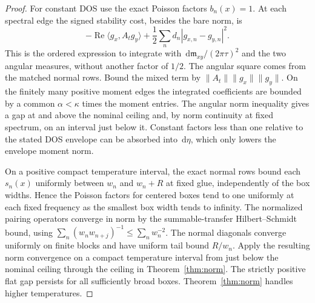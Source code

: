 \documentclass[11pt]{article}
\newcommand{\dd}{\,\mathrm{d}}
\begin{document}
\begin{proof}
For constant DOS use the exact Poisson factors $b_n(x)=1$. At each spectral edge the signed stability cost, besides the bare norm, is
\[
 -\operatorname{Re}\langle g_x,A_tg_y\rangle
 +\frac12\sum_n d_n|g_{x,n}-g_{y,n}|^2 .
\]
This is the ordered expression to integrate with $\dd\mathfrak m_{xy}/(2\pi\tau)^2$ and the two angular measures, without another factor of $1/2$. The angular square comes from the matched normal rows. Bound the mixed term by $\|A_t\|\|g_x\|\|g_y\|$. On the finitely many positive moment edges the integrated coefficients are bounded by a common $\alpha<\kappa$ times the moment entries. The angular norm inequality gives a gap at and above the nominal ceiling and, by norm continuity at fixed spectrum, on an interval just below it. Constant factors less than one relative to the stated DOS envelope can be absorbed into $\dd\eta$, which only lowers the envelope moment norm.

On a positive compact temperature interval, the exact normal rows bound each $s_n(x)$ uniformly between $w_n$ and $w_n+R$ at fixed glue, independently of the box widths. Hence the Poisson factors for centered boxes tend to one uniformly at each fixed frequency as the smallest box width tends to infinity. The normalized pairing operators converge in norm by the summable-transfer Hilbert--Schmidt bound, using $\sum_n(w_nw_{n+j})^{-1}\le\sum_n w_n^{-2}$. The normal diagonals converge uniformly on finite blocks and have uniform tail bound $R/w_n$. Apply the resulting norm convergence on a compact temperature interval from just below the nominal ceiling through the ceiling in Theorem~\ref{thm:norm}. The strictly positive flat gap persists for all sufficiently broad boxes. Theorem~\ref{thm:norm} handles higher temperatures.
\end{proof}
\end{document}
